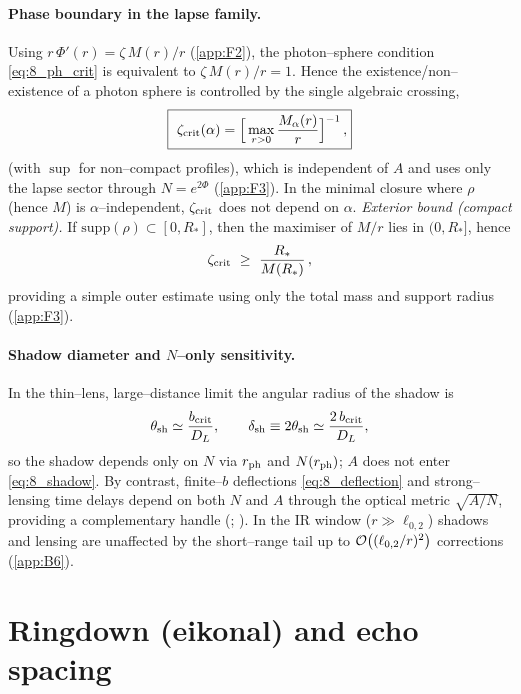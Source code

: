 \documentclass{iopjournal}
\begin{document}
\paragraph{Phase boundary in the lapse family.}
Using $r\,\Phi'(r)=\zeta\,M(r)/r$ (\cref{app:F2}), the photon–sphere condition \eqref{eq:8_ph_crit} is equivalent to $\zeta\,M(r)/r=1$. Hence the existence/non–existence of a photon sphere is controlled by the single algebraic crossing,
\begin{equation}
\boxed{\
\zeta_{\rm crit}(\alpha)=\Big[\max_{r>0}\frac{M_\alpha(r)}{r}\Big]^{-1}\,,
}
\label{eq:8_zeta_crit}
\end{equation}
(with $\sup$ for non–compact profiles), which is independent of $A$ and uses only the lapse sector through $N=e^{2\Phi}$ (\cref{app:F3}). In the minimal closure where $\rho$ (hence $M$) is $\alpha$–independent, $\zeta_{\rm crit}$ does not depend on $\alpha$.
\noindent\textit{Exterior bound (compact support).}
If $\mathrm{supp}(\rho)\subset[0,R_\ast]$, then the maximiser of $M/r$ lies in $(0,R_\ast]$, hence
\begin{equation}
\zeta_{\rm crit}\ \ge\ \frac{R_\ast}{M(R_\ast)}\,,
\label{eq:8_zeta_bound}
\end{equation}
providing a simple outer estimate using only the total mass and support radius (\cref{app:F3}).


\paragraph{Shadow diameter and $N$–only sensitivity.}
In the thin–lens, large–distance limit the angular radius of the shadow is
\begin{equation}
\theta_{\rm sh}\simeq \frac{b_{\rm crit}}{D_L},\qquad
\delta_{\rm sh}\equiv 2\theta_{\rm sh}\simeq \frac{2\,b_{\rm crit}}{D_L},
\label{eq:8_shadow}
\end{equation}
so the shadow depends only on $N$ via $r_{\rm ph}$ and $N(r_{\rm ph})$; $A$ does not enter \eqref{eq:8_shadow}. By contrast, finite–$b$ deflections \eqref{eq:8_deflection} and strong–lensing time delays depend on both $N$ and $A$ through the optical metric $\sqrt{A/N}$, providing a complementary handle (; \cite{Perlick2004LRR,VirbhadraEllis2000,Bozza2002PRD}). In the IR window ($r\gg\ell_{0,2}$) shadows and lensing are unaffected by the short–range tail up to $\order{(\ell_{0,2}/r)^2}$ corrections (\cref{app:B6}).

\section{Ringdown (eikonal) and echo spacing}\label{sec:ringdown}
\end{document}
